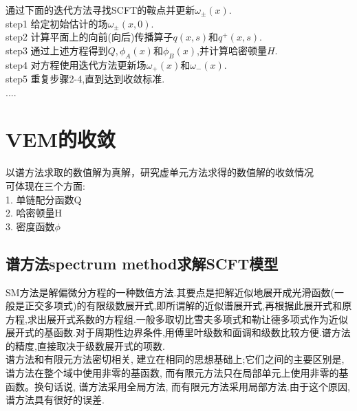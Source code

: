 \documentclass[12pt]{article}
\begin{document}
\begin{CJK}{UTF8}{gkai}
    
    通过下面的迭代方法寻找SCFT的鞍点并更新$\omega_{\pm}(x)$.\\
    
    
    step1 给定初始估计的场$\omega_{\pm}(x,0)$.\\
    
    step2 计算平面上的向前(向后)传播算子$q(x,s)$和$q^+(x,s)$.\\
    
    step3 通过上述方程得到$Q$,\,$\phi_A(x)$和$\phi_B(x)$,并计算哈密顿量$H$.\\
    
    step4 对方程使用迭代方法更新场$\omega_+(x)$和$\omega_-(x)$.\\
    
    step5 重复步骤2-4,直到达到收敛标准.\\
    
  ....\\
    \section{VEM的收敛}
    以谱方法求取的数值解为真解，研究虚单元方法求得的数值解的收敛情况\\
    
    可体现在三个方面:\\
    
    1. 单链配分函数Q\\
    
    2. 哈密顿量H\\
    
    3. 密度函数$\phi$ \\
    
    \subsection{谱方法spectrum method求解SCFT模型}
    
    \qquad SM方法是解偏微分方程的一种数值方法.其要点是把解近似地展开成光滑函数(一般是正交多项式)的有限级数展开式,即所谓解的近似谱展开式,再根据此展开式和原方程,求出展开式系数的方程组.一般多取切比雪夫多项式和勒让德多项式作为近似展开式的基函数.对于周期性边界条件,用傅里叶级数和面调和级数比较方便.谱方法的精度,直接取决于级数展开式的项数.\\
    
    谱方法和有限元方法密切相关, 建立在相同的思想基础上;它们之间的主要区别是, 谱方法在整个域中使用非零的基函数, 而有限元方法只在局部单元上使用非零的基函数。换句话说, 谱方法采用全局方法, 而有限元方法采用局部方法.由于这个原因, 谱方法具有很好的误差.\\
    

\end{CJK}
\end{document}
